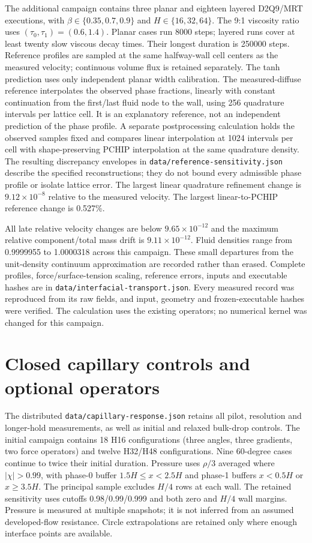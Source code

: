 \documentclass[11pt]{article}
\begin{document}
The additional campaign contains three planar and eighteen layered D2Q9/MRT
executions, with $\beta\in\{0.35,0.7,0.9\}$ and $H\in\{16,32,64\}$.
The 9:1 viscosity ratio uses $(\tau_0,\tau_1)=(0.6,1.4)$.
Planar cases run 8000 steps; layered runs cover at least twenty slow
viscous decay times. Their longest duration is 250000 steps. Reference
profiles are sampled at the same halfway-wall cell centers as the measured
velocity; continuous volume flux is retained separately.
The tanh prediction uses only independent planar width calibration.
The measured-diffuse reference interpolates the observed phase fractions,
linearly with constant continuation from the first/last fluid node to the
wall, using 256 quadrature intervals per lattice cell. It is an explanatory
reference, not an independent prediction of the phase profile. A separate
postprocessing calculation holds the observed samples fixed and compares
linear interpolation at 1024 intervals per cell with shape-preserving PCHIP
interpolation at the same quadrature density. The resulting discrepancy
envelopes in \texttt{data/reference-sensitivity.json} describe the specified
reconstructions; they do not bound every admissible phase profile or isolate
lattice error. The largest linear quadrature refinement change is
$9.12\times10^{-8}$ relative to the measured velocity. The largest
linear-to-PCHIP reference change is 0.527\%.

All late relative velocity changes are below $9.65\times10^{-12}$ and the
maximum relative component/total mass drift is $9.11\times10^{-12}$.
Fluid densities range from 0.9999955 to 1.0000318 across this campaign.
These small departures from the unit-density continuum approximation are
recorded rather than erased. Complete profiles, force/surface-tension scaling,
reference errors, inputs and executable hashes are in
\texttt{data/interfacial-transport.json}. Every measured record was reproduced
from its raw fields, and input, geometry and frozen-executable hashes were
verified. The calculation uses the existing operators; no numerical kernel
was changed for this campaign.

\section{Closed capillary controls and optional operators}
The distributed \texttt{data/capillary-response.json} retains all pilot,
resolution and longer-hold measurements, as well as initial and relaxed
bulk-drop controls. The initial campaign contains 18 H16 configurations
(three angles, three gradients, two force operators) and twelve H32/H48
configurations. Nine 60-degree cases continue to twice their initial
duration. Pressure uses $\rho/3$ averaged where $|\chi|>0.99$, with phase-0
buffer $1.5H\le x<2.5H$ and phase-1 buffers $x<0.5H$ or $x\ge3.5H$.
The principal sample excludes $H/4$ rows at each wall. The retained sensitivity
uses cutoffs 0.98/0.99/0.999 and both zero and $H/4$ wall margins.
Pressure is measured at multiple snapshots; it is not inferred from an
assumed developed-flow resistance. Circle extrapolations are retained only
where enough interface points are available.
\end{document}
